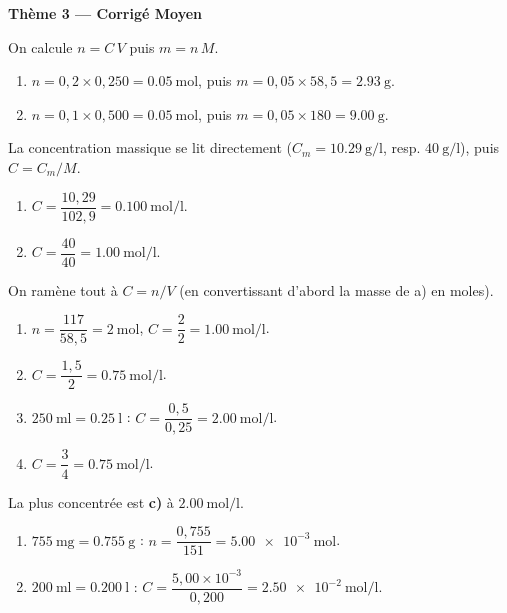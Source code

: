 \documentclass[11pt,a4paper]{article}
\begin{document}
\begin{center}{\large\bfseries\color{primarydark} Thème 3 — Corrigé Moyen}\end{center}

\begin{corrige}
On calcule $n = C\,V$ puis $m = n\,M$.
\begin{enumerate}[label=\alph*)]
  \item $n = 0{,}2\times 0{,}250 = \SI{0.05}{\mole}$, puis $m = 0{,}05\times 58{,}5 = \SI{2.93}{\gram}$.
  \item $n = 0{,}1\times 0{,}500 = \SI{0.05}{\mole}$, puis $m = 0{,}05\times 180 = \SI{9.00}{\gram}$.
\end{enumerate}
\end{corrige}

\begin{corrige}
La concentration massique se lit directement ($C_m = \SI{10.29}{\gram\per\litre}$, resp. $\SI{40}{\gram\per\litre}$),
puis $C = C_m/M$.
\begin{enumerate}[label=\alph*)]
  \item $C = \dfrac{10{,}29}{102{,}9} = \SI{0.100}{\mole\per\litre}$.
  \item $C = \dfrac{40}{40} = \SI{1.00}{\mole\per\litre}$.
\end{enumerate}
\end{corrige}

\begin{corrige}
On ramène tout à $C = n/V$ (en convertissant d'abord la masse de a) en moles).
\begin{enumerate}[label=\alph*)]
  \item $n = \dfrac{117}{58{,}5} = \SI{2}{\mole}$, $C = \dfrac{2}{2} = \SI{1.00}{\mole\per\litre}$.
  \item $C = \dfrac{1{,}5}{2} = \SI{0.75}{\mole\per\litre}$.
  \item $\SI{250}{\milli\litre} = \SI{0.25}{\litre}$ : $C = \dfrac{0{,}5}{0{,}25} = \SI{2.00}{\mole\per\litre}$.
  \item $C = \dfrac{3}{4} = \SI{0.75}{\mole\per\litre}$.
\end{enumerate}
La plus concentrée est \textbf{c)} à $\SI{2.00}{\mole\per\litre}$.
\end{corrige}

\begin{corrige}
\begin{enumerate}[label=\alph*)]
  \item $\SI{755}{\milli\gram} = \SI{0.755}{\gram}$ : $n = \dfrac{0{,}755}{151} = \SI{5.00e-3}{\mole}$.
  \item $\SI{200}{\milli\litre} = \SI{0.200}{\litre}$ : $C = \dfrac{5{,}00\times10^{-3}}{0{,}200} = \SI{2.50e-2}{\mole\per\litre}$.
\end{enumerate}
\end{corrige}
\end{document}
